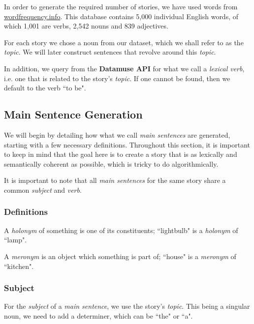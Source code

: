 In order to generate the required number of stories, we have used words from \href{http://www.wordfrequency.info/}{wordfrequency.info}. This database contains 5,000 individual English words, of which 1,001 are verbs, 2,542 nouns and 839 adjectives.

For each story we chose a noun from our dataset, which we shall refer to as the \textit{topic}. We will later construct sentences that revolve around this \textit{topic}.

In addition, we query from the \textbf{Datamuse API} for what we call a \textit{lexical verb}, i.e. one that is related to the story's \textit{topic}. If one cannot be found, then we default to the verb ``to be".

\subsection{Main Sentence Generation}

We will begin by detailing how what we call \textit{main sentences} are generated, starting with a few necessary definitions. Throughout this section, it is important to keep in mind that the goal here is to create a story that is as lexically and semantically coherent as possible, which is tricky to do algorithmically.

It is important to note that all \textit{main sentences} for the same story share a common \textit{subject} and \textit{verb}.

\subsubsection{Definitions}

\begin{definition}[Holonym]
A \textit{holonym} of something is one of its constituents; ``lightbulb" is a \textit{holonym} of ``lamp".
\end{definition}

\begin{definition}[Meronym]
A \textit{meronym} is an object which something is part of; ``house" is a \textit{meronym} of ``kitchen".
\end{definition}

\subsubsection{Subject}

For the \textit{subject} of a \textit{main sentence}, we use the story's \textit{topic}. This being a singular noun, we need to add a determiner, which can be ``the" or ``a".

